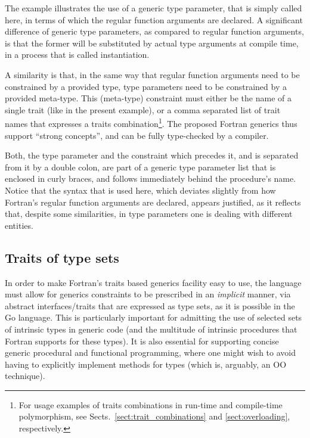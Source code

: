 \documentclass[11pt,oneside]{report}
\newcommand{\code}[1]{{\selectfont\ttfamily{#1}}}
\begin{document}
The example illustrates the use of a generic type parameter, that is
simply called \code{T} here, in terms of which the regular function
arguments are declared. A significant difference of generic type
parameters, as compared to regular function arguments, is that the
former will be substituted by actual type arguments at compile time,
in a process that is called instantiation.

A similarity is that, in the same way that regular function arguments
need to be constrained by a provided type, type parameters need to be
constrained by a provided meta-type. This (meta-type) constraint must
either be the name of a single trait (like \code{INumeric} in the
present example), or a comma separated list of trait names that
expresses a traits combination\footnote{For usage examples of traits
combinations in run-time and compile-time polymorphism, see
Sects.~\ref{sect:trait_combinations} and \ref{sect:overloading},
respectively.}. The proposed Fortran generics thus support ``strong
concepts'', and can be fully type-checked by a compiler.

Both, the type parameter and the constraint which precedes it, and is
separated from it by a double colon, are part of a generic type
parameter list that is enclosed in curly braces, and follows
immediately behind the procedure's name. Notice that the syntax that
is used here, which deviates slightly from how Fortran's regular
function arguments are declared, appears justified, as it reflects
that, despite some similarities, in type parameters one is dealing
with different entities.

\subsection{Traits of type sets}
\label{sect:type_sets}

In order to make Fortran's traits based generics facility easy to use,
the language must allow for generics constraints to be prescribed in
an \emph{implicit} manner, via abstract interfaces/traits that are
expressed as type sets, as it is possible in the Go language. This is
particularly important for admitting the use of selected sets of
intrinsic types in generic code (and the multitude of intrinsic
procedures that Fortran supports for these types). It is also
essential for supporting concise generic procedural and functional
programming, where one might wish to avoid having to explicitly
implement methods for types (which is, arguably, an OO technique).
\end{document}
